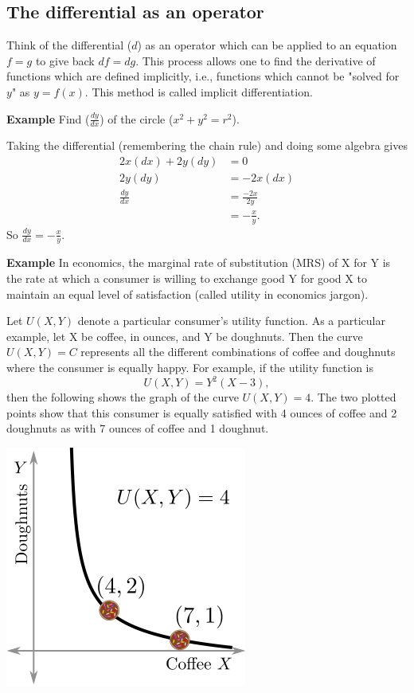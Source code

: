 \documentclass[twoside,openright,titlepage,a4paper]{book}
\begin{document}
\begin{sloppypar}
\subsection{The differential as an operator}

Think of the differential ($d$) as an operator which can be applied to an equation $f=g$ to give back $df = dg$. This process allows one to find the derivative of functions which are defined implicitly, i.e., functions which cannot be "solved for $y$" as $y=f(x)$. This method is called implicit differentiation.

\textbf{Example} Find ($\frac{dy}{dx}$) of the circle ($x^2+y^2=r^2$).
\begin{examplebox}
Taking the differential (remembering the chain rule) and doing some algebra gives
\begin{align*}
2x(dx) + 2y(dy) &= 0 \\
2y(dy) &= -2x(dx) \\
\frac{dy}{dx} &= \frac{-2x}{2y} \\
&= -\frac{x}{y}.
\end{align*}
So $\frac{dy}{dx} = -\frac{x}{y}$.	
\end{examplebox}

\textbf{Example} In economics, the marginal rate of substitution (MRS) of X for Y is the rate at which a consumer is willing to exchange good Y for good X to maintain an equal level of satisfaction (called utility in economics jargon).

Let $U(X,Y)$ denote a particular consumer's utility function. As a particular example, let X be coffee, in ounces, and Y be doughnuts. Then the curve $U(X,Y) = C$ represents all the different combinations of coffee and doughnuts where the consumer is equally happy. For example, if the utility function is \[ U(X,Y) = Y^2(X-3), \] then the following shows the graph of the curve $U(X,Y) = 4$. The two plotted points show that this consumer is equally satisfied with 4 ounces of coffee and 2 doughnuts as with 7 ounces of coffee and 1 doughnut.
\begin{center}\includegraphics[scale=0.6]{CoffeeDoughnuts}\end{center}	


\end{sloppypar}
\end{document}
